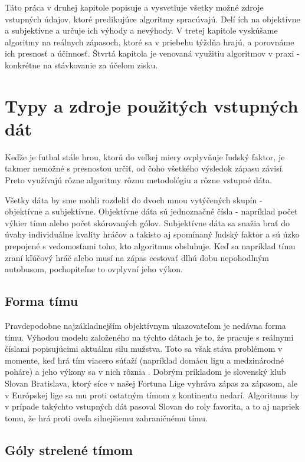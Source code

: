 \documentclass[10pt,twoside,slovak,a4paper]{article}
\begin{document}
Táto práca v druhej kapitole popisuje a vysvetľuje všetky možné zdroje vstupných údajov, ktoré predikujúce algoritmy spracúvajú. Delí ích na objektívne a subjektívne a určuje ich výhody a nevýhody. V tretej kapitole vyskúšame algoritmy na reálnych zápasoch, ktoré sa v priebehu týždňa hrajú, a porovnáme ich presnosť a účinnosť. Štvrtá kapitola je venovaná využitiu algoritmov v praxi - konkrétne na stávkovanie za účelom zisku.

\section{Typy a zdroje použitých vstupných dát}

Keďže je futbal stále hrou, ktorú do veľkej miery ovplyvňuje ľudský faktor, je takmer nemožné s presnosťou určiť, od čoho všetkého výsledok zápasu závisí. Preto využívajú rôzne algoritmy rôznu metodológiu a rôzne vstupné dáta.

Všetky dáta by sme mohli rozdeliť do dvoch mnou vytýčených skupín - objektívne a subjektívne. Objektívne dáta sú jednoznačné čísla - napríklad počet výhier tímu alebo počet skórovaných gólov. Subjektívne dáta sa snažia brať do úvahy individuálne kvality hráčov a takisto aj spomínaný ľudský faktor a sú úzko prepojené s vedomosťami toho, kto algoritmus obsluhuje. Keď sa napríklad tímu zraní kľúčový hráč alebo musí na zápas cestovať dlhú dobu nepohodlným autobusom, pochopiteľne to ovplyvní jeho výkon.

\subsection{Forma tímu}

Pravdepodobne najzákladnejším objektívnym ukazovateľom je nedávna forma tímu. Výhodou modelu založeného na týchto dátach je to, že pracuje s reálnymi číslami popisujúcimi aktuálnu silu mužstva. Toto sa však stáva problémom v momente, keď hrá tím viacero súťaží (napríklad domácu ligu a medzinárodné poháre) a jeho výkony sa v nich rôznia \cite{dixon1997modelling}. Dobrým príkladom je slovenský klub Slovan Bratislava, ktorý síce v našej Fortuna Lige vyhráva zápas za zápasom, ale v Európskej lige sa mu proti ostatným tímom z kontinentu nedarí. Algoritmus by v prípade takýchto vstupných dát pasoval Slovan do roly favorita, a to aj napriek tomu, že hrá proti oveľa silnejšiemu zahraničnému tímu.

\subsection{Góly strelené tímom}
\end{document}
